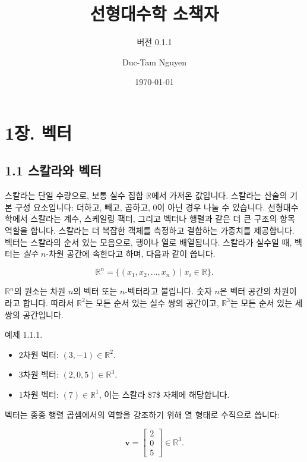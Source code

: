 \documentclass[
  12pt,
  a4paper,
]{article}
\title{선형대수학 소책자}
\subtitle{버전 0.1.1}
\author{Duc-Tam Nguyen}
\date{\today}
\let\oldsection\section
\renewcommand{\section}{\clearpage\oldsection}
\begin{document}
\maketitle

{
\hypersetup{linkcolor=}
\setcounter{tocdepth}{2}
\tableofcontents
}
\section{1장. 벡터}\label{chapter-1-vectors}

\subsection{1.1 스칼라와 벡터}\label{11-scalars-and-vectors}

스칼라는 단일 수량으로, 보통 실수 집합 \(\mathbb{R}\)에서 가져온 값입니다. 스칼라는 산술의 기본 구성 요소입니다: 더하고, 빼고, 곱하고, 0이 아닌 경우 나눌 수 있습니다. 선형대수학에서 스칼라는 계수, 스케일링 팩터, 그리고 벡터나 행렬과 같은 더 큰 구조의 항목 역할을 합니다. 스칼라는 더 복잡한 객체를 측정하고 결합하는 가중치를 제공합니다. 벡터는 스칼라의 순서 있는 모음으로, 행이나 열로 배열됩니다. 스칼라가 실수일 때, 벡터는 \emph{실수} \(n\)-차원 공간에 속한다고 하며, 다음과 같이 씁니다.

\[\mathbb{R}^n = \{ (x_1, x_2, \dots, x_n) \mid x_i \in \mathbb{R} \}.\]

\(\mathbb{R}^n\)의 원소는 차원 \(n\)의 벡터 또는 \(n\)-벡터라고 불립니다. 숫자 \(n\)은 벡터 공간의 차원이라고 합니다. 따라서 \(\mathbb{R}^2\)는 모든 순서 있는 실수 쌍의 공간이고, \(\mathbb{R}^3\)는 모든 순서 있는 세 쌍의 공간입니다.

예제 1.1.1.

\begin{itemize}
\item
  2차원 벡터: \((3, -1) \in \mathbb{R}^2\).
\item
  3차원 벡터: \((2, 0, 5) \in \mathbb{R}^3\).
\item
  1차원 벡터: \((7) \in \mathbb{R}^1\), 이는 스칼라 \$7\$ 자체에 해당합니다.
\end{itemize}

벡터는 종종 행렬 곱셈에서의 역할을 강조하기 위해 열 형태로 수직으로 씁니다:

\[\mathbf{v} = \begin{bmatrix}
2 \\
0 \\
5 \end{bmatrix} \in \mathbb{R}^3.\]
\end{document}
